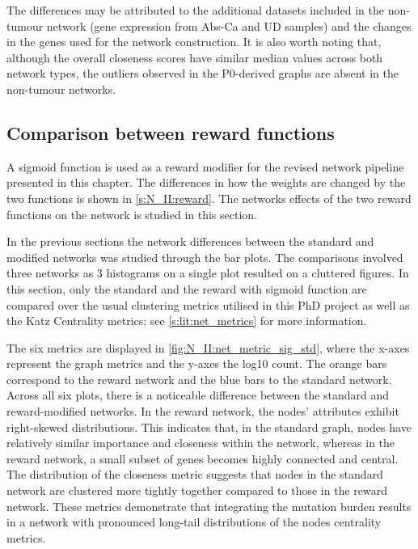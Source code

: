 The differences may be attributed to the additional datasets included in the non-tumour network (gene expression from Abs-Ca and UD samples) and the changes in the genes used for the network construction. It is also worth noting that, although the overall closeness scores have similar median values across both network types, the outliers observed in the P0-derived graphs are absent in the non-tumour networks.


\subsection{Comparison between reward functions} \label{s:N_II:reward_comp}

A sigmoid function is used as a reward modifier for the revised network pipeline presented in this chapter. The differences in how the weights are changed by the two functions is shown in \cref{s:N_II:reward}. The networks effects of the two reward functions on the network is studied in this section.

In the previous sections the network differences between the standard and modified networks was studied through the bar plots. The comparisons involved three networks as 3 histograms on a single plot resulted on a cluttered figures. In this section, only the standard and the reward with sigmoid function are compared over the usual clustering metrics utilised in this PhD project as well as the Katz Centrality metrics; see \cref{s:lit:net_metrics} for more information.

The six metrics are displayed in \cref{fig:N_II:net_metric_sig_std}, where the x-axes represent the graph metrics and the y-axes the log10 count. The orange bars correspond to the reward network and the blue bars to the standard network. Across all six plots, there is a noticeable difference between the standard and reward-modified networks. In the reward network, the nodes' attributes exhibit right-skewed distributions. This indicates that, in the standard graph, nodes have relatively similar importance and closeness within the network, whereas in the reward network, a small subset of genes becomes highly connected and central. The distribution of the closeness metric suggests that nodes in the standard network are clustered more tightly together compared to those in the reward network. These metrics demonstrate that integrating the mutation burden results in a network with pronounced long-tail distributions of the nodes centrality metrics.



